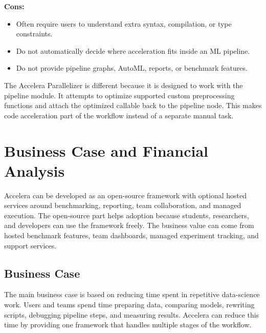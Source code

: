 \documentclass[12pt,a4paper]{report}
\begin{document}
\textbf{Cons:}
\begin{itemize}
  \item Often require users to understand extra syntax, compilation, or type
  constraints.
  \item Do not automatically decide where acceleration fits inside an ML
  pipeline.
  \item Do not provide pipeline graphs, AutoML, reports, or benchmark features.
\end{itemize}

The Accelera Parallelizer is different because it is designed to work with the
pipeline module. It attempts to optimize supported custom preprocessing
functions and attach the optimized callable back to the pipeline node. This makes
code acceleration part of the workflow instead of a separate manual task.

\section{Business Case and Financial Analysis}

Accelera can be developed as an open-source framework with optional hosted
services around benchmarking, reporting, team collaboration, and managed
execution. The open-source part helps adoption because students, researchers,
and developers can use the framework freely. The business value can come from
hosted benchmark features, team dashboards, managed experiment tracking, and
support services.

\subsection{Business Case}

The main business case is based on reducing time spent in repetitive
data-science work. Users and teams spend time preparing data, comparing models,
rewriting scripts, debugging pipeline steps, and measuring results. Accelera can
reduce this time by providing one framework that handles multiple stages of the
workflow.
\end{document}
